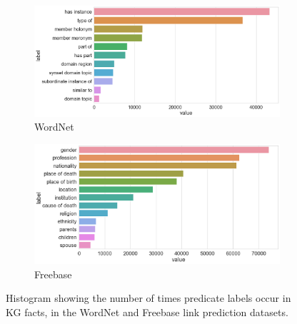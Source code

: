 

\begin{figure}
	\begin{subfigure}[b]{.5\linewidth}
   		\centering
    		\includegraphics[width=1.0\linewidth, height=0.6\linewidth]{Wordnet_Predicate_Counts}
		\captionsetup{justification=centering}
		\caption{WordNet}
	\end{subfigure}
	\begin{subfigure}[b]{.5\linewidth}
   		\centering
		\includegraphics[width=1.0\linewidth, height=0.6\linewidth]{Freebase_Predicate_Counts}
		\captionsetup{justification=centering}
		\caption{Freebase}
	\end{subfigure}
	\captionsetup{justification=centering}
	\caption{Histogram showing the number of times predicate labels occur in KG facts, in the WordNet and Freebase link prediction datasets.}
\end{figure}



